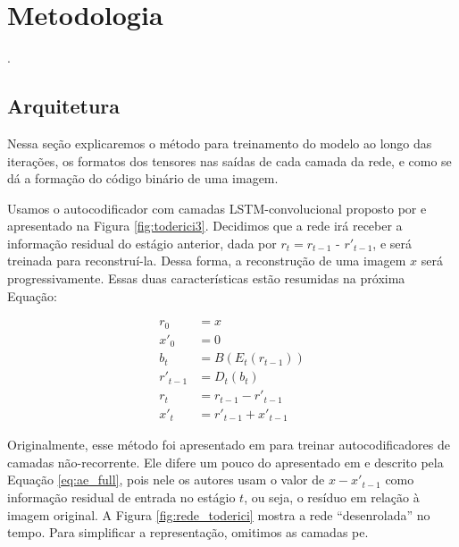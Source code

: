 \chapter{Metodologia}


.  

\section{Arquitetura} \label{sec:arq}

Nessa seção explicaremos o método para treinamento do modelo ao longo das iterações, os formatos dos tensores nas saídas de cada camada da rede, e como se dá a formação do código binário de uma imagem.   

Usamos o autocodificador com camadas LSTM-convolucional proposto por \cite{FullResolution2017Toderici} e apresentado na Figura \ref{fig:toderici3}. 
Decidimos que a rede irá receber a informação residual do estágio anterior, dada por $ r_t = r_{t-1}$ - $r'_{t-1}$, e será treinada para reconstruí-la. Dessa forma, a reconstrução de uma imagem $x$ será progressivamente. Essas duas características estão resumidas na próxima Equação:

\begin{equation}
\label{eq:model_1it}
\begin{aligned}
r_{0} &=x\\
x'_0  &=0 \\
b_{t} &= B(E_{t}(r_{t-1})) \\
r'_{t-1} &= D_{t}(b_{t}) \\
r_{t} &= r_{t-1}- r'_{t-1} \\
x'_t &= r'_{t-1} + x'_{t-1}  
\end{aligned}
\end{equation}

Originalmente, esse método foi apresentado em \cite{Variable2016Toderici} para treinar autocodificadores de camadas não-recorrente. 
Ele difere um pouco do apresentado em \cite{FullResolution2017Toderici} e descrito pela Equação \ref{eq:ae_full},  pois nele os autores usam o valor de $x-x'_{t-1}$ como  informação residual de entrada no estágio $t$, ou seja, o resíduo em relação à imagem original.
A Figura \ref{fig:rede_toderici} mostra a rede ``desenrolada'' no tempo. Para simplificar a representação, omitimos as camadas \acrshort{pe}. 

